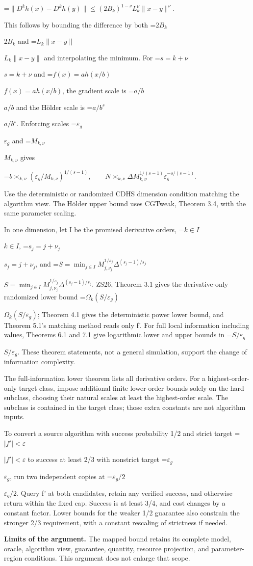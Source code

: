 \documentclass[10pt,a4paper]{article}
\newcommand{\AtlasMath}[1]{\par\begingroup\centering\setbox0=\hbox{$\displaystyle #1$}\ifdim\wd0>1.4\linewidth\typeout{ATLAS WIDE FORMULA: \the\wd0}\fi\ifdim\wd0>\linewidth\resizebox{\linewidth}{!}{\box0}\else\box0\fi\par\endgroup}
\newcommand{\AtlasInlineMath}[1]{\begingroup\setbox0=\hbox{$#1$}\ifdim\wd0>.4\linewidth\endgroup\AtlasMath{#1}\else\endgroup$#1$\fi}
\begin{document}
\AtlasMath{\|D^kh(x)-D^kh(y)\|\le(2B_k)^{1-\nu}L_k^\nu\|x-y\|^\nu.}

This follows by bounding the difference by both \AtlasInlineMath{2B_k} and \AtlasInlineMath{L_k\|x-y\|} and interpolating the minimum. For \AtlasInlineMath{s=k+\nu} and \AtlasInlineMath{f(x)=a h(x/b)}, the gradient scale is \AtlasInlineMath{a/b} and the Hölder scale is \AtlasInlineMath{a/b^s}. Enforcing scales \AtlasInlineMath{\varepsilon_g} and \AtlasInlineMath{M_{k,\nu}} gives

\AtlasMath{b\asymp_{k,\nu}(\varepsilon_g/M_{k,\nu})^{1/(s-1)},\qquad
N\asymp_{k,\nu}\Delta M_{k,\nu}^{1/(s-1)}\varepsilon_g^{-s/(s-1)}.}

Use the deterministic or randomized CDHS dimension condition matching the algorithm view. The Hölder upper bound uses CGTweak, Theorem 3.4, with the same parameter scaling.

In one dimension, let I be the promised derivative orders, \AtlasInlineMath{k\in I}, \AtlasInlineMath{s_j=j+\nu_j}, and \AtlasInlineMath{S=\min_{j\in I}M_{j,\nu_j}^{1/s_j}\Delta^{(s_j-1)/s_j}}. ZS26, Theorem 3.1 gives the derivative-only randomized lower bound \AtlasInlineMath{\Omega_k(S/\varepsilon_g)}; Theorem 4.1 gives the deterministic power lower bound, and Theorem 5.1's matching method reads only f'. For full local information including values, Theorems 6.1 and 7.1 give logarithmic lower and upper bounds in \AtlasInlineMath{S/\varepsilon_g}. These theorem statements, not a general simulation, support the change of information complexity.

The full-information lower theorem lists all derivative orders. For a highest-order-only target class, impose additional finite lower-order bounds solely on the hard subclass, choosing their natural scales at least the highest-order scale. The subclass is contained in the target class; those extra constants are not algorithm inputs.

To convert a source algorithm with success probability 1/2 and strict target \AtlasInlineMath{|f'|<\varepsilon} to success at least 2/3 with nonstrict target \AtlasInlineMath{\varepsilon_g}, run two independent copies at \AtlasInlineMath{\varepsilon_g/2}. Query f' at both candidates, retain any verified success, and otherwise return within the fixed cap. Success is at least 3/4, and cost changes by a constant factor. Lower bounds for the weaker 1/2 guarantee also constrain the stronger 2/3 requirement, with a constant rescaling of strictness if needed.

\textbf{Limits of the argument.} The mapped bound retains its complete model, oracle, algorithm view, guarantee, quantity, resource projection, and parameter-region conditions. This argument does not enlarge that scope.
\end{document}

